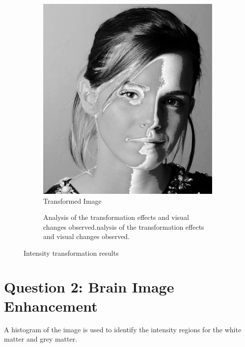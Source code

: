 \documentclass[11pt]{article}
\begin{document}
\begin{figure}[H]
\begin{subfigure}{0.3\textwidth}
        \includegraphics[width=\textwidth]{resources/emma_transformed.jpg}
        \caption{Transformed Image}
    \end{subfigure}
    \hfill
    \begin{subfigure}{0.3\textwidth}
        Analysis of the transformation effects and visual changes observed.nalysis of the transformation effects and visual changes observed.
    \end{subfigure}
    \caption{Intensity transformation results}
\end{figure}



\section*{Question 2: Brain Image Enhancement}
A histogram of the image is used to identify the intensity regions for the white matter and grey matter.
\end{document}
